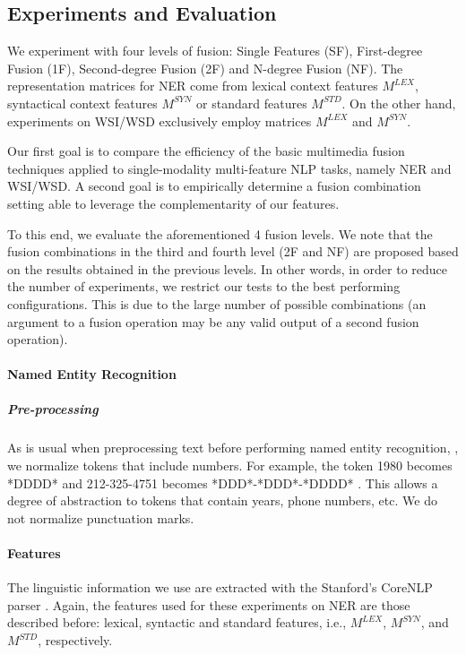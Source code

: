 \subsection{Experiments and Evaluation}
\label{chap6:expes}

We experiment with four levels of fusion: Single Features (SF), First-degree Fusion (1F), Second-degree Fusion (2F) and N-degree Fusion (NF). The representation matrices for NER come from lexical context features $M^{LEX}$, syntactical context features $M^{SYN}$ or standard features $M^{STD}$.  On the other hand, experiments on WSI/WSD exclusively employ matrices $M^{LEX}$ and $M^{SYN}$.

Our first goal is to compare the efficiency of the basic multimedia fusion techniques applied to  single-modality multi-feature NLP tasks, namely NER and WSI/WSD. A second goal is to empirically determine a fusion combination setting able to leverage the complementarity of our features.

To this end, we evaluate the aforementioned 4 fusion levels. We note that the fusion combinations in the third and fourth level (2F and NF) are proposed based on the results obtained in the previous levels. In other words, in order to reduce the number of experiments, we restrict our tests to the best performing configurations. This is due to the large number of possible combinations (an argument to a fusion operation may be any valid output of a second fusion operation).


\paragraph{Named Entity Recognition}

\subparagraph{Pre-processing}

As is usual when preprocessing text before performing named entity recognition, \cite{RatinovR09}, we normalize tokens that include numbers. For example, the token 1980 becomes *DDDD* and 212-325-4751 becomes *DDD*-*DDD*-*DDDD* . This allows a degree of abstraction to tokens that contain years, phone numbers, etc. We do not normalize punctuation marks.

\paragraph{Features}
The linguistic information we use are extracted with the Stanford's CoreNLP parser \cite{manning2014}. Again, the features used for these experiments on NER are those described before: lexical, syntactic and standard features, i.e., $M^{LEX}$, $M^{SYN}$, and $M^{STD}$, respectively. 

